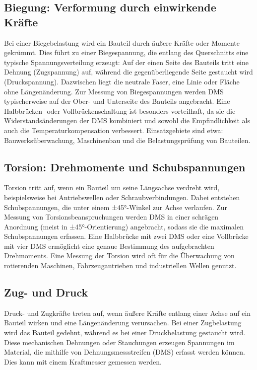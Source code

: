 \subsection{Biegung: Verformung durch einwirkende Kräfte}
Bei einer Biegebelastung wird ein Bauteil durch äußere Kräfte oder Momente gekrümmt. Dies führt zu einer Biegespannung, die entlang des Querschnitts eine typische Spannungsverteilung erzeugt: Auf der einen Seite des Bauteils tritt eine Dehnung (Zugspannung) auf, während die gegenüberliegende Seite gestaucht wird (Druckspannung). Dazwischen liegt die neutrale Faser, eine Linie oder Fläche ohne Längenänderung.
Zur Messung von Biegespannungen werden DMS typischerweise auf der Ober- und Unterseite des Bauteils angebracht. Eine Halbbrücken- oder Vollbrückenschaltung ist besonders vorteilhaft, da sie die Widerstandsänderungen der DMS kombiniert und sowohl die Empfindlichkeit als auch die Temperaturkompensation verbessert. Einsatzgebiete sind etwa: Bauwerksüberwachung, Maschinenbau und die Belastungsprüfung von Bauteilen.

\subsection{Torsion: Drehmomente und Schubspannungen}
Torsion tritt auf, wenn ein Bauteil um seine Längsachse verdreht wird, beispielsweise bei Antriebswellen oder Schraubverbindungen. Dabei entstehen Schubspannungen, die unter einem ±45°-Winkel zur Achse verlaufen.
Zur Messung von Torsionsbeanspruchungen werden DMS in einer schrägen Anordnung (meist in ±45°-Orientierung) angebracht, sodass sie die maximalen Schubspannungen erfassen. Eine Halbbrücke mit zwei DMS oder eine Vollbrücke mit vier DMS ermöglicht eine genaue Bestimmung des aufgebrachten Drehmoments. Eine Messung der Torsion wird oft für die Überwachung von rotierenden Maschinen, Fahrzeugantrieben und industriellen Wellen genutzt.

\subsection{Zug- und Druck}
Druck- und Zugkräfte treten auf, wenn äußere Kräfte entlang einer Achse auf ein Bauteil wirken und eine Längenänderung verursachen. Bei einer Zugbelastung wird das Bauteil gedehnt, während es bei einer Druckbelastung gestaucht wird. Diese mechanischen Dehnungen oder Stauchungen erzeugen Spannungen im Material, die mithilfe von Dehnungsmessstreifen (DMS) erfasst werden können.
Dies kann mit einem Kraftmesser gemessen werden.





